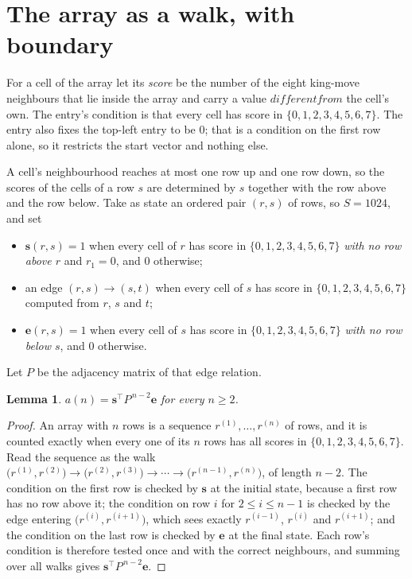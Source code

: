 \documentclass[11pt,a4paper]{article}
\theoremstyle{plain}
\newtheorem{lemma}[theorem]{Lemma}
\theoremstyle{definition}
\begin{document}
\section{The array as a walk, with boundary}

For a cell of the array let its \emph{score} be the number of the eight king-move neighbours that lie inside
the array and carry a value $different from$ the cell's own. The entry's condition is that every cell
has score in $\{0,1,2,3,4,5,6,7\}$. The entry also fixes the top-left entry to be $0$; that is a condition on the first row alone, so it restricts the start vector and nothing else.

A cell's neighbourhood reaches at most one row up and one row down, so the scores of the
cells of a row $s$ are determined by $s$ together with the row above and the row below.
Take as state an ordered pair $(r,s)$ of rows, so $S=1024$, and set
\begin{itemize}
\item $\mathbf{s}(r,s)=1$ when every cell of $r$ has score in $\{0,1,2,3,4,5,6,7\}$ \emph{with no row
above $r$} and $r_1=0$, and $0$ otherwise;
\item an edge $(r,s)\to(s,t)$ when every cell of $s$ has score in $\{0,1,2,3,4,5,6,7\}$ computed from
$r$, $s$ and $t$;
\item $\mathbf{e}(r,s)=1$ when every cell of $s$ has score in $\{0,1,2,3,4,5,6,7\}$ \emph{with no row
below $s$}, and $0$ otherwise.
\end{itemize}
Let $P$ be the adjacency matrix of that edge relation.

\begin{lemma}\label{lem:walk}
$a(n)=\mathbf{s}^{\!\top}P^{\,n-2}\mathbf{e}$ for every $n\ge2$.
\end{lemma}

\begin{proof}
An array with $n$ rows is a sequence $r^{(1)},\dots,r^{(n)}$ of rows, and it is counted
exactly when every one of its $n$ rows has all scores in $\{0,1,2,3,4,5,6,7\}$. Read the sequence as the
walk $\bigl(r^{(1)},r^{(2)}\bigr)\to\bigl(r^{(2)},r^{(3)}\bigr)\to\cdots\to
\bigl(r^{(n-1)},r^{(n)}\bigr)$, of length $n-2$. The condition on the first row is
checked by $\mathbf{s}$ at the initial state, because a first row has no row above it; the
condition on row $i$ for $2\le i\le n-1$ is checked by the edge entering
$\bigl(r^{(i)},r^{(i+1)}\bigr)$, which sees exactly $r^{(i-1)}$, $r^{(i)}$ and
$r^{(i+1)}$; and the condition on the last row is checked by $\mathbf{e}$ at the final
state. Each row's condition is therefore tested once and with the correct neighbours, and
summing over all walks gives $\mathbf{s}^{\!\top}P^{\,n-2}\mathbf{e}$.
\end{proof}
\end{document}
